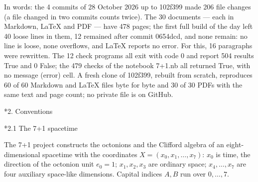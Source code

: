 \documentclass[10pt,a4paper]{article}
\makeatletter
\renewcommand\section{\@startsection{section}{1}{\z@}{-3.5ex \@plus -1ex \@minus -.2ex}{2.3ex \@plus.2ex}{\normalfont\Large\bfseries\raggedright}}
\renewcommand\subsection{\@startsection{subsection}{2}{\z@}{-3.25ex\@plus -1ex \@minus -.2ex}{1.5ex \@plus .2ex}{\normalfont\large\bfseries\raggedright}}
\makeatother
\begin{document}
In words: the 4 commits of 28 October 2026 up to 102f399 made 206 file changes (a file changed in two commits counts twice). The 30 documents — each in Markdown, LaTeX and PDF — have 478 pages; the first full build of the day left 40 loose lines in them, 12 remained after commit 0654dcd, and none remain: no line is loose, none overflows, and LaTeX reports no error. For this, 16 paragraphs were rewritten. The 12 check programs all exit with code 0 and report 504 results True and 0 False; the 479 checks of the notebook 7+1.nb all returned True, with no message (error) cell. A fresh clone of 102f399, rebuilt from scratch, reproduces 60 of 60 Markdown and LaTeX files byte for byte and 30 of 30 PDFs with the same text and page count; no private file is on GitHub.

\section*{2. Conventions}
\subsection*{2.1 The 7+1 spacetime}
The 7+1 project constructs the octonions and the Clifford algebra of an eight-dimensional spacetime with the coordinates $X=(x_0,x_1,\dots,x_7)$: $x_0$ is time, the direction of the octonion unit $e_0=1$; $x_1,x_2,x_3$ are ordinary space; $x_4,\dots,x_7$ are four auxiliary space-like dimensions. Capital indices $A,B$ run over $0,\dots,7$.
\end{document}
